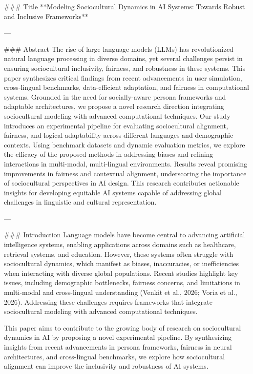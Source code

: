 ### Title  
**Modeling Sociocultural Dynamics in AI Systems: Towards Robust and Inclusive Frameworks**

---

### Abstract  
The rise of large language models (LLMs) has revolutionized natural language processing in diverse domains, yet several challenges persist in ensuring sociocultural inclusivity, fairness, and robustness in these systems. This paper synthesizes critical findings from recent advancements in user simulation, cross-lingual benchmarks, data-efficient adaptation, and fairness in computational systems. Grounded in the need for socially-aware persona frameworks and adaptable architectures, we propose a novel research direction integrating sociocultural modeling with advanced computational techniques. Our study introduces an experimental pipeline for evaluating sociocultural alignment, fairness, and logical adaptability across different languages and demographic contexts. Using benchmark datasets and dynamic evaluation metrics, we explore the efficacy of the proposed methods in addressing biases and refining interactions in multi-modal, multi-lingual environments. Results reveal promising improvements in fairness and contextual alignment, underscoring the importance of sociocultural perspectives in AI design. This research contributes actionable insights for developing equitable AI systems capable of addressing global challenges in linguistic and cultural representation.

---

### Introduction  
Language models have become central to advancing artificial intelligence systems, enabling applications across domains such as healthcare, retrieval systems, and education. However, these systems often struggle with sociocultural dynamics, which manifest as biases, inaccuracies, or inefficiencies when interacting with diverse global populations. Recent studies highlight key issues, including demographic bottlenecks, fairness concerns, and limitations in multi-modal and cross-lingual understanding (Venkit et al., 2026; Voria et al., 2026). Addressing these challenges requires frameworks that integrate sociocultural modeling with advanced computational techniques.

This paper aims to contribute to the growing body of research on sociocultural dynamics in AI by proposing a novel experimental pipeline. By synthesizing insights from recent advancements in persona frameworks, fairness in neural architectures, and cross-lingual benchmarks, we explore how sociocultural alignment can improve the inclusivity and robustness of AI systems.

